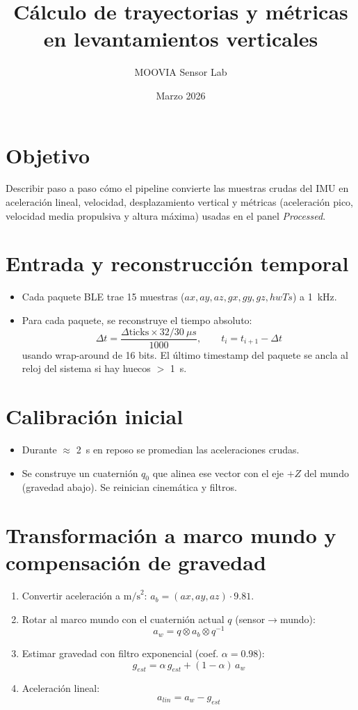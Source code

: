 \documentclass[11pt,a4paper]{article}
\title{Cálculo de trayectorias y métricas en levantamientos verticales}
\author{MOOVIA Sensor Lab}
\date{Marzo 2026}
\begin{document}
\maketitle

\section*{Objetivo}
Describir paso a paso cómo el pipeline convierte las muestras crudas del IMU en aceleración lineal, velocidad, desplazamiento vertical y métricas (aceleración pico, velocidad media propulsiva y altura máxima) usadas en el panel \emph{Processed}.

\section{Entrada y reconstrucción temporal}
\begin{itemize}[leftmargin=12pt]
  \item Cada paquete BLE trae 15 muestras (\(ax, ay, az, gx, gy, gz, hwTs\)) a \SI{1}{kHz}.
  \item Para cada paquete, se reconstruye el tiempo absoluto:
  \[
    \Delta t = \frac{\Delta \text{ticks} \times 32/30\ \mu s}{1000}, \qquad
    t_i = t_{i+1} - \Delta t
  \]
  usando wrap-around de 16 bits. El último timestamp del paquete se ancla al reloj del sistema si hay huecos \(>\) \SI{1}{s}.
\end{itemize}

\section{Calibración inicial}
\begin{itemize}[leftmargin=12pt]
  \item Durante \(\approx\) \SI{2}{s} en reposo se promedian las aceleraciones crudas.
  \item Se construye un cuaternión \(q_0\) que alinea ese vector con el eje \(+Z\) del mundo (gravedad abajo). Se reinician cinemática y filtros.
\end{itemize}

\section{Transformación a marco mundo y compensación de gravedad}
\begin{enumerate}[leftmargin=14pt]
  \item Convertir aceleración a \(\text{m/s}^2\): \(a_b = (ax, ay, az)\cdot 9.81\).
  \item Rotar al marco mundo con el cuaternión actual \(q\) (sensor\(\rightarrow\)mundo):
  \[
    a_w = q \otimes a_b \otimes q^{-1}
  \]
  \item Estimar gravedad con filtro exponencial (coef. \(\alpha=0.98\)):
  \[
    g_{est} = \alpha\, g_{est} + (1-\alpha)\, a_w
  \]
  \item Aceleración lineal:
  \[
    a_{lin} = a_w - g_{est}
  \]
\end{enumerate}
\end{document}
